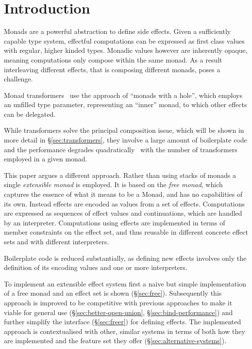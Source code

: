 \section{Introduction}

\label{sec:introduction}

Monads are a powerful abstraction to define side effects. Given a sufficiently
capable type system, effectful computations can be expressed as first class
values with regular, higher kinded types. Monadic values however are inherently
opaque, meaning computations only compose within the same monad. As a result
interleaving different effects, that is composing different monads, poses a
challenge.

Monad transformers~\cite{transformer-inspiration} use the approach of ``monads
with a hole'', which employs an unfilled type parameter, representing an
``inner'' monad, to which other effects can be delegated.

While transformers solve the principal composition issue, which will be shown in
more detail in §\ref{sec:transformers}, they involve a large amount of
boilerplate code and the performance degrades quadratically~\cite{freer} with
the number of transformers employed in a given monad.

This paper argues a different approach. Rather than using stacks of monads a
single \emph{extensible monad} is employed. It is based on the \emph{free
  monad}, which captures the essence of what it means to be a Monad, and has no
capabilities of its own. Instead effects are encoded as values from a set of
effects. Computations are expressed as sequences of effect values and
continuations, which are handled by an interpreter. Computations using effects
are implemented in terms of member constraints on the effect set, and thus
reusable in different concrete effect sets and with different interpreters.

Boilerplate code is reduced substantially, as defining new effects involves only
the definition of its encoding values and one or more interpreters.

To implement an extensible effect system first a naive but simple implementation
of a free monad and an effect set is shown (§\ref{sec:free}). Subsequently this
approach is improved to be competitive with previous approaches to make it
viable for general use (§\ref{sec:better-open-union},
§\ref{sec:bind-performance}) and further simplify the interface
(§\ref{sec:freer}) for defining effects. The implemented approach is
contextualised with other, similar systems in terms of both how they are
implemented and the feature set they offer (§\ref{sec:alternative-systems}).
